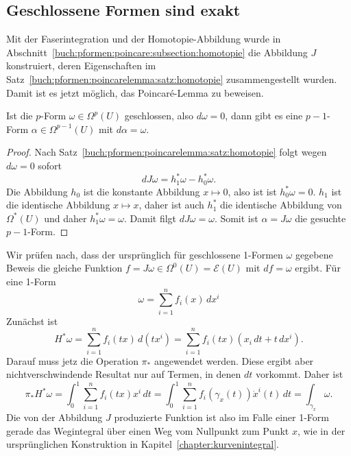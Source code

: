 %
%
\subsection{Geschlossene Formen sind exakt}
Mit der Faserintegration und der Homotopie-Abbildung wurde
in Abschnitt~\ref{buch:pformen:poincare:subsection:homotopie}
die Abbildung $J$ konstruiert, deren Eigenschaften im
Satz~\ref{buch:pformen:poincarelemma:satz:homotopie}
zusammengestellt wurden.
Damit ist es jetzt möglich, das Poincaré-Lemma zu beweisen.

\begin{satz}
Ist die $p$-Form $\omega\in\Omega^p(U)$ geschlossen, also $d\omega=0$,
dann gibt es eine $p-1$-Form $\alpha\in\Omega^{p-1}(U)$ mit
$d\alpha=\omega$.
\end{satz}

\begin{proof}
Nach Satz~\ref{buch:pformen:poincarelemma:satz:homotopie} folgt
wegen $d\omega=0$ sofort
\[
dJ\omega
=
h_1^*\omega - h_0^*\omega.
\]
Die Abbildung $h_0$ ist die konstante Abbildung $x\mapsto 0$, also ist ist
$h_0^*\omega=0$.
$h_1$ ist die identische Abbildung $x\mapsto x$, daher ist auch $h_1^*$
die identische Abbildung von $\Omega^*(U)$ und daher $h_1^*\omega=\omega$.
Damit filgt $dJ\omega=\omega$.
Somit ist $\alpha =J\omega$ die gesuchte $p-1$-Form.
\end{proof}

Wir prüfen nach, dass der ursprünglich für geschlossene 1-Formen
$\omega$ gegebene Beweis die gleiche Funktion
$f=J\omega\in\Omega^0(U)=\mathscr{E}(U)$ mit $df=\omega$ ergibt.
Für eine 1-Form
\[
\omega = \sum_{i=1}^nf_i(x)\, dx^i
\]
Zunächst ist
\[
H^*\omega
=
\sum_{i=1}^nf_i(tx)\, d(tx^i)
=
\sum_{i=1}^nf_i(tx) (x_i\, dt + t\, dx^i).
\]
Darauf muss jetz die Operation $\pi_*$ angewendet werden.
Diese ergibt aber nichtverschwindende Resultat nur auf Termen, in
denen $dt$ vorkommt.
Daher ist
\[
\pi_*H^*\omega
=
\int_0^1
\sum_{i=1}^n
f_i(tx) x^i\, dt
=
\int_0^1
\sum_{i=1}^n
f_i(\gamma_x(t)) \dot{x}^i(t)\, dt
=
\int_{\gamma_x}
\omega.
\]
Die von der Abbildung $J$ produzierte Funktion ist also im Falle
einer 1-Form gerade das Wegintegral über einen Weg vom Nullpunkt zum
Punkt $x$, wie in der ursprünglichen Konstruktion in
Kapitel~\ref{chapter:kurvenintegral}.
